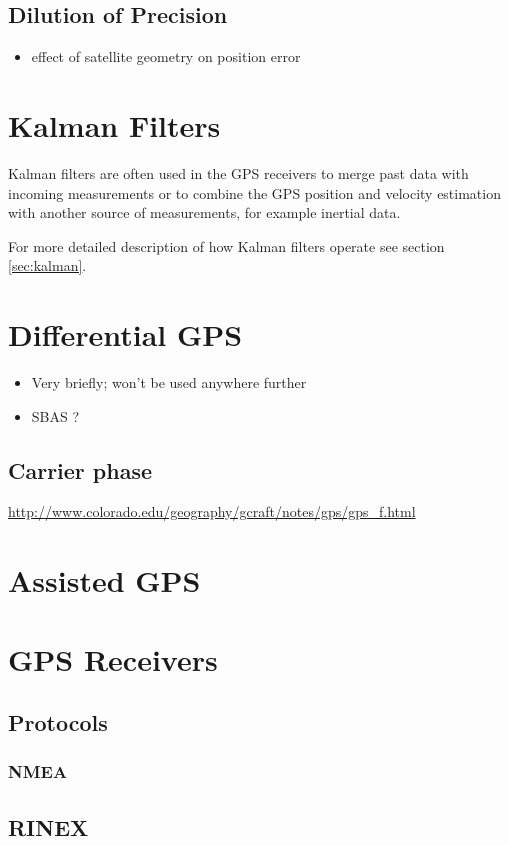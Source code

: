 \subsection{Dilution of Precision}
\begin{itemize}
\item effect of satellite geometry on position error
\end{itemize}

\section{Kalman Filters}
Kalman filters are often used in the GPS receivers to merge past
data with incoming measurements or to combine the GPS position and velocity
estimation with another source of measurements, for example inertial data.

For more detailed description of how Kalman filters operate see section
\ref{sec:kalman}.

\section{Differential GPS}
\begin{itemize}
\item Very briefly; won't be used anywhere further
\item SBAS ?
\end{itemize}

\subsection{Carrier phase}
\url{http://www.colorado.edu/geography/gcraft/notes/gps/gps_f.html}


\section{Assisted GPS}


\section{GPS Receivers}
\subsection{Protocols}
\subsubsection{NMEA}
\subsection{RINEX}
